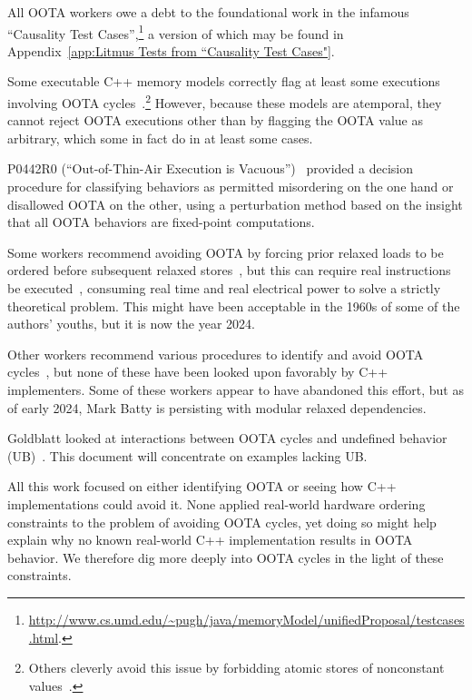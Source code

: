\documentclass[10]{article}
\begin{document}
All OOTA workers owe a debt to the foundational work in the infamous
``Causality Test Cases'',\footnote{
	\url{http://www.cs.umd.edu/~pugh/java/memoryModel/unifiedProposal/testcases.html}.}
a version of which may be found in
Appendix~\ref{app:Litmus Tests from “Causality Test Cases"}.

Some executable C++ memory models correctly flag at least some executions
involving OOTA cycles~\cite{JadeAlglave2014HerdingCats}.\footnote{
	Others cleverly avoid this issue by forbidding atomic
	stores of nonconstant values~\cite{MarkBatty2011cppmem}.}
However, because these models are atemporal, they cannot reject
OOTA executions other than by flagging the OOTA value as arbitrary,
which some in fact do in at least some cases.

P0442R0 (``Out-of-Thin-Air Execution is Vacuous'')~\cite{PaulEMcKenney2016OOTA}
provided a decision procedure for classifying behaviors as permitted
misordering on the one hand or disallowed OOTA on the other, using
a perturbation method based on the insight that all OOTA behaviors are
fixed-point computations.

Some workers recommend avoiding OOTA by forcing prior relaxed
loads to be ordered before subsequent relaxed
stores~\cite{Boehm:2014:OGA:2618128.2618134,HansBoehm2019OOTArevisitedAgain,Lahav:2017:RSC:3062341.3062352},
but this can require real instructions be
executed~\cite[Section 7.1]{Maranget2012TutorialARMPower},
consuming real time and real electrical power to solve a strictly
theoretical problem.
This might have been acceptable in the 1960s of some of the authors'
youths, but it is now the year 2024.

Other workers recommend various procedures to identify and avoid OOTA
cycles~\cite{Lahav:2017:RSC:3062341.3062352,Sinclair:2017:CAR:3079856.3080206,Lee:10.1145/3385412.3386010,MarkBatty2019ModularRelaxedDependenciesOOTA},
but none of these have been looked upon favorably by C++ implementers.
Some of these workers appear to have abandoned this effort, but as of
early 2024, Mark Batty is persisting with modular relaxed dependencies.

Goldblatt looked at interactions between OOTA cycles and
undefined behavior (UB)~\cite{DavidGoldblatt2019NoElegantOOTAfix}.
This document will concentrate on examples lacking UB.

All this work focused on either identifying OOTA or seeing how C++
implementations could avoid it.
None applied real-world hardware ordering constraints to the problem
of avoiding OOTA cycles,
yet doing so might help explain why no known real-world C++ implementation
results in OOTA behavior.
We therefore dig more deeply into OOTA cycles in the light
of these constraints.
\end{document}
